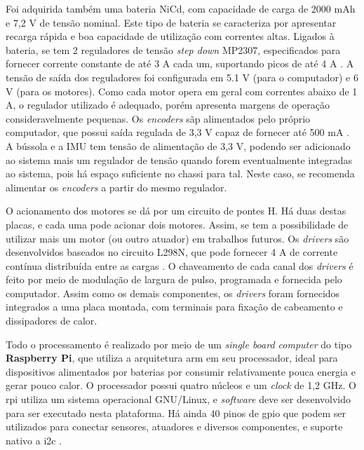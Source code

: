 Foi adquirida também uma bateria NiCd, com capacidade de carga de 2000 mAh e 7,2 V de tensão nominal. Este tipo de bateria se caracteriza por apresentar recarga rápida e boa capacidade de utilização com correntes altas. Ligados à bateria, se tem 2 reguladores de tensão \textit{step down} MP2307, especificados para fornecer corrente constante de até 3 A cada um, suportando picos de até 4 A \citep{MP2307}. A tensão de saída dos reguladores foi configurada em 5.1 V (para o computador) e 6 V (para os motores). Como cada motor opera em geral com correntes abaixo de 1 A, o regulador utilizado é adequado, porém apresenta margens de operação consideravelmente pequenas. Os \textit{encoders} sãp alimentados pelo próprio computador, que possui saída regulada de 3,3 V capaz de fornecer até 500 mA \citep{upton2014raspberry}. A bússola e a IMU tem tensão de alimentação de 3,3 V, podendo ser adicionado ao sistema mais um regulador de tensão quando forem eventualmente integradas ao sistema, pois há espaço suficiente no chassi para tal. Neste caso, se recomenda alimentar os \textit{encoders} a partir do mesmo regulador.

O acionamento dos motores se dá por um circuito de pontes H. Há duas destas placas, e cada uma pode acionar dois motores. Assim, se tem a possibilidade de utilizar mais um motor (ou outro atuador) em trabalhos futuros. Os \textit{drivers} são desenvolvidos baseados no circuito L298N, que pode fornecer 4 A de corrente contínua distribuída entre as cargas \citep{L298N}. O chaveamento de cada canal dos \textit{drivers} é feito por meio de modulação de largura de pulso, programada e fornecida pelo computador. Assim como os demais componentes, os \textit{drivers} foram fornecidos integrados a uma placa montada, com terminais para fixação de cabeamento e dissipadores de calor.

Todo o processamento é realizado por meio de um \emph{single board computer} do tipo \textbf{Raspberry Pi}, que utiliza a arquitetura \acrshort{arm} em seu processador, ideal para dispositivos alimentados por baterias por consumir relativamente pouca energia e gerar pouco calor. O processador possui quatro núcleos e um \emph{clock} de 1,2 GHz. O \acrshort{rpi} utiliza um sistema operacional GNU/Linux, e \emph{software} deve ser desenvolvido para ser executado nesta plataforma. Há ainda 40 pinos de \acrshort{gpio} que podem ser utilizados para conectar sensores, atuadores e diversos componentes, e suporte nativo a \acrshort{i2c} \citep{upton2014raspberry}.


